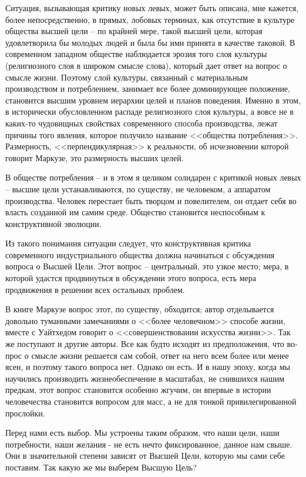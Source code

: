 \documentclass{book}
\begin{document}
Ситуация, вызывающая критику новых левых, может быть описана, мне кажется, более непосредственно, в прямых, лобо­вых терминах, как отсутствие в культуре общества высшей це­ли -- по крайней мере, такой высшей цели, которая удовлетво­рила бы молодых людей и была бы ими принята в качестве та­ковой. В современном западном обществе наблюдается эрозия того слоя культуры (религиозного  слоя в широком смысле слова), который дает ответ на вопрос о смысле жизни. Поэто­му слой культуры, связанный с материальным производством и потреблением, занимает все более доминирующее положение, становится высшим уровнем иерархии целей и планов поведе­ния. Именно в этом, в исторически обусловленном распаде ре­лигиозного слоя культуры, а вовсе не в каких-то чудовищных свойствах современного способа производства, лежат причины того явления, которое получило название <<общества потребле­ния>>. Размерность, <<перпендикулярная>> к реальности, об исчез­новении которой говорит Маркузе, это размерность высших целей.

В обществе потребления -- и в этом я целиком солидарен с критикой новых левых -- высшие цели устанавливаются, по су­ществу, не человеком, а аппаратом производства. Человек пе­рестает быть творцом и повелителем, он отдает себя во власть созданной им самим среде. Общество становится неспособным к конструктивной эволюции.

Из такого понимания ситуации следует, что конструктивная критика современного индустриального общества должна на­чинаться с обсуждения вопроса о Высшей Цели. Этот вопрос -- центральный, это узкое место; мера, в которой удастся продви­нуться в обсуждении этого вопроса, есть мера продвижения в решении всех остальных проблем.

В книге Маркузе вопрос этот, по существу, обходится; ав­тор отделывается довольно туманными замечаниями о <<более человечном>> способе жизни, вместе с Уайтхедом говорит о <<со­вершенствовании искусства жизни>>. Так же поступают и другие авторы. Все как будто исходят из предположения, что во­прос о смысле жизни решается сам собой, ответ на него всем более или менее ясен, и поэтому такого вопроса нет. Однако он есть. И в нашу эпоху, когда мы научились производить жизнеобеспечение в масштабах, не снившихся нашим предкам, этот вопрос становится особенно жгучим, он впервые в исто­рии человечества становится вопросом для масс,  а не для тонкой привилегированной прослойки.

Перед нами есть выбор. Мы устроены таким образом, что наши цели, наши потребности, наши желания - не есть нечто фиксированное, данное нам свыше. Они в значительной степе­ни зависят от Высшей Цели, которую мы сами себе поставим. Так какую же мы выберем Высшую Цель?
\end{document}
